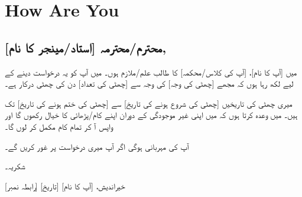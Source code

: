 \documentclass[12pt]{article}
\begin{document}
{
\tableofcontents
}


\section{How Are You}

\begin{otherlanguage}{urdu}
\subsection{
محترم/محترمہ [استاد/مینجر کا نام],
}

\vspace{1cm}
میں [آپ کا نام]، [آپ کی کلاس/محکمہ] کا طالب علم/ملازم ہوں۔ میں آپ کو یہ درخواست دینے کے لیے لکھ رہا ہوں کہ مجھے [چھٹی کی وجہ] کی وجہ سے [چھٹی کی تعداد] دن کی چھٹی درکار ہے۔

میری چھٹی کی تاریخیں [چھٹی کی شروع ہونے کی تاریخ] سے [چھٹی کی ختم ہونے کی تاریخ] تک ہیں۔ میں وعدہ کرتا ہوں کہ میں اپنی غیر موجودگی کے دوران اپنے کام/پڑھائی کا خیال رکھوں گا اور واپس آ کر تمام کام مکمل کر لوں گا۔

آپ کی مہربانی ہوگی اگر آپ میری درخواست پر غور کریں گے۔

شکریہ۔

خیراندیش، [آپ کا نام]
[تاریخ]
[رابطہ نمبر]

\vspace{2cm}
\end{otherlanguage}
\end{document}
